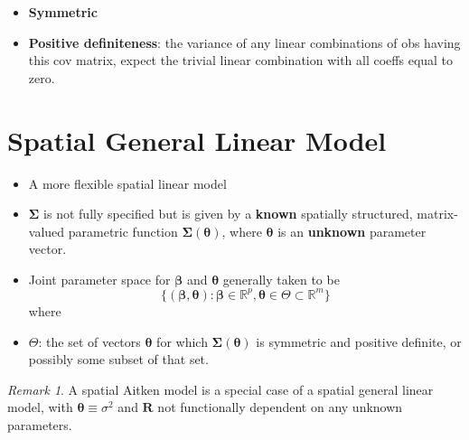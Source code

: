 \documentclass[
  letterpaper,
  DIV=11,
  numbers=noendperiod]{scrreprt}
\theoremstyle{definition}
\theoremstyle{plain}
\theoremstyle{definition}
\theoremstyle{definition}
\theoremstyle{remark}
\newtheorem{refremark}{Remark}[chapter]
\begin{document}
\begin{itemize}
\item
  \textbf{Symmetric}
\item
  \textbf{Positive definiteness}: the variance of any linear
  combinations of obs having this cov matrix, expect the trivial linear
  combination with all coeffs equal to zero.
\end{itemize}

\section{Spatial General Linear
Model}\label{spatial-general-linear-model}

\begin{itemize}
\item
  A more flexible spatial linear model
\item
  \(\pmb{\Sigma}\) is not fully specified but is given by a
  \textbf{known} spatially structured, matrix-valued parametric function
  \(\pmb{\Sigma}(\pmb{\theta})\), where \(\pmb{\theta}\) is an
  \textbf{unknown} parameter vector.
\item
  Joint parameter space for \(\pmb{\beta}\) and \(\pmb{\theta}\)
  generally taken to be \[
  \{ (\pmb{\beta}, \pmb{\theta}): \pmb{\beta} \in \mathbb{R}^p, \pmb{\theta} \in \Theta \subset \mathbb{R}^m \}
  \] where
\item
  \(\Theta\): the set of vectors \(\pmb{\theta}\) for which
  \(\pmb{\Sigma}(\pmb{\theta})\) is symmetric and positive definite, or
  possibly some subset of that set.
\end{itemize}

\begin{refremark}
A spatial Aitken model is a special case of a spatial general linear
model, with \(\pmb{\theta} \equiv \sigma^2\) and \(\pmb{R}\) not
functionally dependent on any unknown parameters.

\label{rem-Aitken}

\end{refremark}
\end{document}
